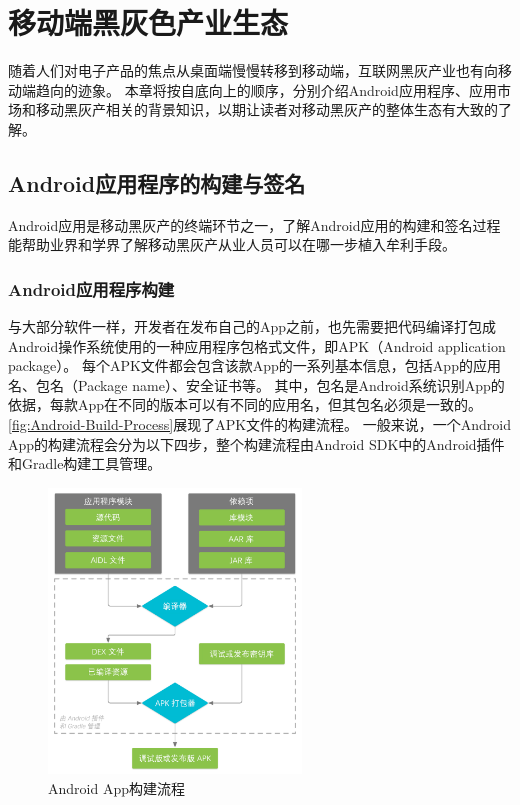 \chapter{移动端黑灰色产业生态}
\label{chp:background}

随着人们对电子产品的焦点从桌面端慢慢转移到移动端，互联网黑灰产业也有向移动端趋向的迹象。
本章将按自底向上的顺序，分别介绍Android应用程序、应用市场和移动黑灰产相关的背景知识，以期让读者对移动黑灰产的整体生态有大致的了解。

\section{Android应用程序的构建与签名}
\label{sec:signature}

Android应用是移动黑灰产的终端环节之一，了解Android应用的构建和签名过程能帮助业界和学界了解移动黑灰产从业人员可以在哪一步植入牟利手段。

\subsection{Android应用程序构建}

与大部分软件一样，开发者在发布自己的App之前，也先需要把代码编译打包成Android操作系统使用的一种应用程序包格式文件，即APK（Android application package）。
每个APK文件都会包含该款App的一系列基本信息，包括App的应用名、包名（Package name）、安全证书等。
其中，包名是Android系统识别App的依据，每款App在不同的版本可以有不同的应用名，但其包名必须是一致的。
\autoref{fig:Android-Build-Process}展现了APK文件的构建流程。
一般来说，一个Android App的构建流程会分为以下四步，整个构建流程由Android SDK中的Android插件和Gradle构建工具管理。

\begin{figure}[htbp]
	\centering
	\includegraphics[width=0.6\textwidth]{./Figures/edwin-build-process-CHN.png}
	\caption{Android App构建流程}
	\label{fig:Android-Build-Process}
\end{figure}

